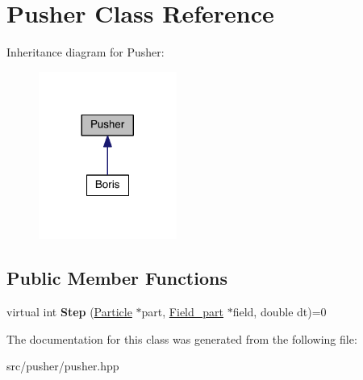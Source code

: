 \hypertarget{class_pusher}{}\section{Pusher Class Reference}
\label{class_pusher}


Inheritance diagram for Pusher\+:
\nopagebreak
\begin{figure}[H]
\begin{center}
\leavevmode
\includegraphics[width=128pt]{class_pusher__inherit__graph}
\end{center}
\end{figure}
\subsection*{Public Member Functions}
\begin{DoxyCompactItemize}
\item 
\hypertarget{class_pusher_a8a9a5faace14e07e8b42fb51cc83088e}{}\label{class_pusher_a8a9a5faace14e07e8b42fb51cc83088e} 
virtual int {\bfseries Step} (\hyperlink{struct_particle}{Particle} $\ast$part, \hyperlink{struct_field__part}{Field\+\_\+part} $\ast$field, double dt)=0
\end{DoxyCompactItemize}


The documentation for this class was generated from the following file\+:\begin{DoxyCompactItemize}
\item 
src/pusher/pusher.\+hpp\end{DoxyCompactItemize}

